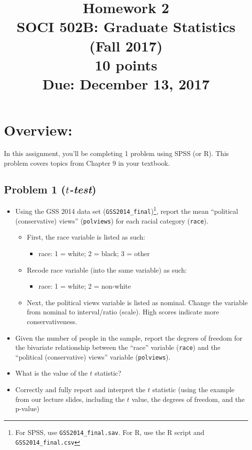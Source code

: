 \documentclass{article}
\begin{document}
\title{Homework 2\\ SOCI 502B: Graduate Statistics (Fall 2017) \\ {\large{10 points}} \\ {\large{Due: December 13, 2017}}}
\author[*]{}
\date{}
\maketitle



\section*{Overview:}
In this assignment, you'll be completing 1 problem using SPSS (or R). This problem covers topics from Chapter 9 in your textbook.

\subsection*{Problem 1 (\textit{$t$-test})}
\begin{itemize}
\item Using the GSS 2014 data set (\texttt{GSS2014\_final})\footnote{For SPSS, use \texttt{GSS2014\_final.sav}. For R, use the R script and \texttt{GSS2014\_final.csv}}, report the mean ``political (conservative) views'' (\texttt{polviews}) for each racial category (\texttt{race}).
\begin{itemize}
\item First, the race variable is listed as such:
\begin{itemize}
\item race: 1 = white; 2 = black; 3 = other
\end{itemize}
\item Recode race variable (into the same variable) as such:
\begin{itemize}
\item race: 1 = white; 2 = non-white
\end{itemize}
\item Next, the political views variable is listed as nominal. Change the variable from nominal to interval/ratio (scale). High scores indicate more conservativeness. 
\end{itemize}
\item Given the number of people in the sample, report the degrees of freedom for the bivariate relationship between the ``race'' variable (\texttt{race}) and the ``political (conservative) views'' variable (\texttt{polviews}). 
\item What is the value of the $t$ statistic? 
\item Correctly and fully report and interpret the $t$ statistic (using the example from our lecture slides, including the $t$ value, the degrees of freedom, and the p-value)
\end{itemize}
\end{document}
